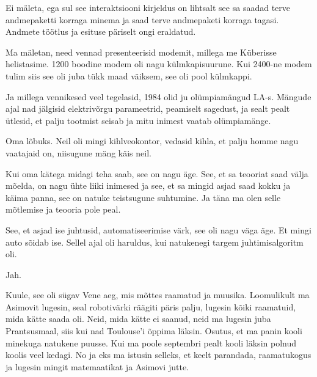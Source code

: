 Ei mäleta, ega sul see interaktsiooni kirjeldus on lihtsalt see sa saadad terve andmepaketti korraga minema ja saad terve andmepaketi korraga tagasi. Andmete  töötlus  ja esituse päriselt ongi eraldatud. 


Ma mäletan, need vennad  presenteerisid modemit, millega me  Küberisse helistasime. 1200 boodine modem oli nagu külmkapisuurune. Kui 2400-ne modem tulim siis see oli juba tükk maad väiksem, see oli pool külmkappi.

Ja millega vennikesed veel tegelasid, 1984 olid ju olümpiamängud LA-s. Mängude ajal nad jälgisid elektrivõrgu parameetrid, peamiselt sagedust, ja sealt pealt ütlesid, et palju tootmist seisab ja mitu inimest vaatab olümpiamänge. 


Oma lõbuks. Neil oli mingi kihlveokontor, vedasid kihla, et palju homme nagu vaatajaid on, niisugune mäng käis neil.

                              
Kui oma kätega midagi teha saab, see on nagu äge. See, et sa teooriat saad välja mõelda, on nagu ühte liiki inimesed ja see, et sa mingid asjad saad kokku ja käima panna, see on natuke teistsugune suhtumine. Ja täna ma olen selle mõtlemise ja teooria pole peal.
                 
                 
See, et asjad ise juhtusid, automatiseerimise värk, see oli nagu väga äge. Et mingi auto sõidab ise. Sellel ajal oli haruldus,  kui natukenegi targem juhtimisalgoritm oli.


Jah.


Kuule, see oli sügav Vene aeg, mis mõttes  raamatud ja muusika. Loomulikult ma Asimovit lugesin, seal robotivärki räägiti päris palju, lugesin kõiki raamatuid, mida kätte saada oli. Neid, mida kätte ei saanud, neid ma lugesin juba Prantsusmaal, siis kui nad Toulouse'i  õppima läksin. Osutus, et ma panin  kooli minekuga natukene puusse. Kui ma poole septembri pealt kooli läksin polnud koolis veel kedagi. No ja eks ma istusin selleks, et keelt parandada,  raamatukogus ja lugesin  mingit matemaatikat ja Asimovi jutte.


